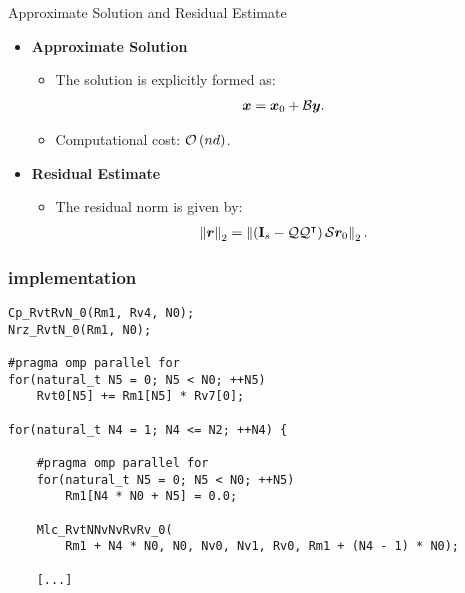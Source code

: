 \begin{frame}{Approximate Solution and Residual Estimate}
    \begin{itemize}
        \item \textbf{Approximate Solution}
        \begin{itemize}
            \item The solution is explicitly formed as:
            \begin{align}
                \bm{x} = \bm{x}_0 + \mathcal{B} \bm{y}.
            \end{align}
            \item Computational cost: $\mathcal{O} \left( n d \right)$.
        \end{itemize}
        \vspace{0.5cm}
        \item \textbf{Residual Estimate} 
        \begin{itemize}
            \item The residual norm is given by:
            \begin{align}
                \left\lVert \bm{r} \right\rVert_2 = 
                \left\lVert  \left( \mathbf{I}_s - \mathcal{Q} \mathcal{Q}^{\intercal} \right) \mathcal{S} \bm{r}_0  \right\rVert_2.
            \end{align}
        \end{itemize}
    \end{itemize}
\end{frame}

\begin{frame}[fragile] %
    \frametitle{implementation}

\begin{lstlisting}[style=cpp]
Cp_RvtRvN_0(Rm1, Rv4, N0);
Nrz_RvtN_0(Rm1, N0);

#pragma omp parallel for
for(natural_t N5 = 0; N5 < N0; ++N5)
    Rvt0[N5] += Rm1[N5] * Rv7[0];

for(natural_t N4 = 1; N4 <= N2; ++N4) {

    #pragma omp parallel for
    for(natural_t N5 = 0; N5 < N0; ++N5)
        Rm1[N4 * N0 + N5] = 0.0;

    Mlc_RvtNNvNvRvRv_0(
        Rm1 + N4 * N0, N0, Nv0, Nv1, Rv0, Rm1 + (N4 - 1) * N0);

    [...]
\end{lstlisting}

\end{frame}

